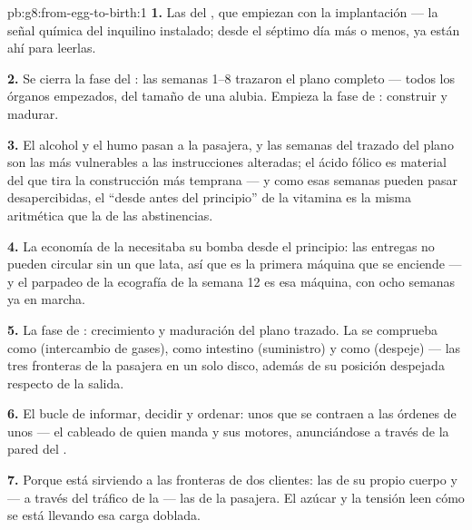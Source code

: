 \begin{solution}{pb:g8:from-egg-to-birth:1}
\textbf{1.} Las  del , que empiezan con la implantación
--- la señal química del inquilino instalado; desde el séptimo día más
o menos, ya están ahí para leerlas.

\textbf{2.} Se cierra la fase del : las semanas 1--8 trazaron el
plano completo --- todos los órganos empezados, del tamaño de una
alubia. Empieza la fase de : construir y madurar.

\textbf{3.} El alcohol y el humo pasan a la pasajera, y las semanas del
trazado del plano son las más vulnerables a las instrucciones
alteradas; el ácido fólico es material del que tira la construcción más
temprana --- y como esas semanas pueden pasar desapercibidas, el
``desde antes del principio'' de la vitamina es la misma aritmética que
la de las abstinencias.

\textbf{4.} La economía de la  necesitaba su bomba desde el
principio: las entregas no pueden circular sin un  que lata, así
que es la primera máquina que se enciende --- y el parpadeo de la
ecografía de la semana 12 es esa máquina, con ocho semanas ya en marcha.

\textbf{5.} La fase de : crecimiento y maduración del plano
trazado. La  se comprueba como  (intercambio de gases),
como intestino (suministro) y como  (despeje) --- las tres
fronteras de la pasajera en un solo disco, además de su posición
despejada respecto de la salida.

\textbf{6.} El bucle de informar, decidir y ordenar: unos  que
se contraen a las órdenes de unos  --- el cableado de quien
manda y sus motores, anunciándose a través de la pared del .

\textbf{7.} Porque está sirviendo a las fronteras de dos clientes: las
de su propio cuerpo y --- a través del tráfico de la  --- las
de la pasajera. El azúcar y la tensión leen cómo se está llevando esa
carga doblada.


\end{solution}
